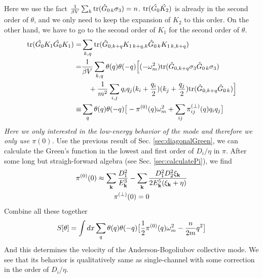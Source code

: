 Here we use the fact $\frac{1}{{\beta{}V}}\sum_{k}\text{tr}(\hat{G}_{0\,k}\sigma_3)=n$. $\text{tr}(\hat{G_{0}}\hat{K_2})$ is already in the second order of $\theta$, and we only need to keep the expansion of $K_2$ to this order. On the other hand, we have to go to the second order of $K_1$ for the second order of $\theta$. 
\begin{align}		
\text{tr}(\hat{G_{0}}{K_1}\hat{G_{0}}{K_1})=&\sum_{k,q}\text{tr}(\hat{G}_{0,k+q}K_{1\,k+q,k}\hat{G}_{0\,k}K_{1\,k,k+q})\\
=&\frac{1}{{\beta{}V}}\sum_{k,q}\theta(q)\theta(-q)\Big[(-\omega_m^2)\text{tr}(\hat{G}_{0,k+q}\sigma_3\hat{G}_{0\,k}\sigma_3)\nonumber\\
&\quad+\frac{1}{m^2}\sum_{i,j}q_iq_j(k_i+\frac{q_i}{2})(k_j+\frac{q_j}{2})\text{tr}(\hat{G}_{0,k+q}\hat{G}_{0\,k})\Big]\nonumber\\
\equiv&\sum_{q}\theta(q)\theta(-q)\big[-\pi^{(0)}(q)\omega_m^2+\sum_{ij}\pi^{(\perp)}_{ij}(q)q_iq_j\big]
\end{align}
\emph{Here we only interested in the low-energy behavior of the mode and therefore we only use $\pi(0)$.} Use the previous result of Sec. \ref{sec:diagonalGreen}, we can calculate the Green's function in the lowest and first order of $D_i/\eta$ in $\pi$.  After some long but straigh-forward algebra (see Sec. \ref{sec:calculatePi}), we find
\begin{gather}
\pi^{(0)}(0)\approx\sum_{\mathbf{k}}\frac{D_{1}^{2}}{E_{\mathbf{k}}^{3}}-\sum_{\mathbf{k}}\frac{D_{1}^{2}D_{2}^{2}\xi_{\mathbf{k}}}{2E_{\mathbf{k}}^{5}(\xi_{\mathbf{k}}+\eta)}\\
\pi^{(\perp)}(0)=0
\end{gather}
Combine all these together
\begin{equation}
S[\theta]=\int{dx}\sum_{q}\theta(q)\theta(-q)\big[\frac{1}{2}\pi^{(0)}(q)\omega_m^2-\frac{n}{2m}q^2\big]
\end{equation}
And this determines the velocity of the Anderson-Bogoliubov collective mode.  We see that its behavior is qualitatively same as  single-channel with some correction in the order of $D_{i}/\eta$.



\begin{subappendices}

\end{subappendices}






